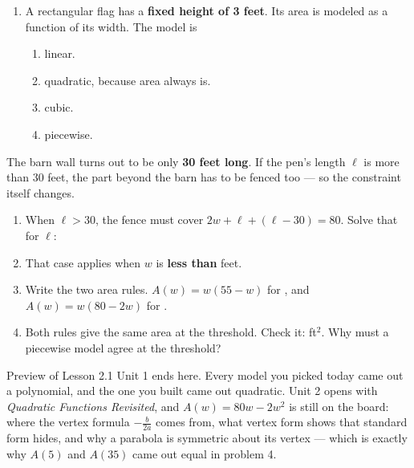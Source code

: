 \documentclass[10pt]{article}
\begin{document}
\begin{enumerate}[itemsep=10pt]
\begin{enumerate}[label=(\alph*), itemsep=6pt]
  \item A rectangular flag has a \textbf{fixed height of 3 feet}. Its area is
        modeled as a function of its width. The model is

        \begin{enumerate}[label=\Alph*., itemsep=2pt]
          \item linear.
          \item quadratic, because area always is.
          \item cubic.
          \item piecewise.
        \end{enumerate}
\end{enumerate}

\end{enumerate}

\vspace{0.1in}

\boxguard
\begin{extensionbox}
The barn wall turns out to be only \textbf{30 feet long}. If the pen's length
$\ell$ is more than 30 feet, the part beyond the barn has to be fenced too ---
so the constraint itself changes.

\begin{enumerate}[label=(\alph*), itemsep=4pt]
  \item When $\ell > 30$, the fence must cover $2w + \ell + (\ell - 30) = 80$.
        Solve that for $\ell$: \blank{3.4cm}
  \item That case applies when $w$ is \textbf{less than} \blank{1.6cm} feet.
  \item Write the two area rules. \quad $A(w) = w(55 - w)$ for
        \blank{2.6cm}, \quad and $A(w) = w(80 - 2w)$ for \blank{2.6cm}.
  \item Both rules give the same area at the threshold. Check it:
        \blank{2cm} ft$^2$. Why must a piecewise model agree at the threshold?

        \writeline
\end{enumerate}
\end{extensionbox}

\vspace{0.1in}

\boxguard
\begin{notesbox}{Preview of Lesson 2.1}
Unit 1 ends here. Every model you picked today came out a polynomial, and the
one you built came out quadratic. Unit 2 opens with \textit{Quadratic Functions
Revisited}, and $A(w) = 80w - 2w^2$ is still on the board: where the vertex
formula $-\frac{b}{2a}$ comes from, what vertex form shows that standard form
hides, and why a parabola is symmetric about its vertex --- which is exactly
why $A(5)$ and $A(35)$ came out equal in problem 4.
\end{notesbox}
\end{document}
